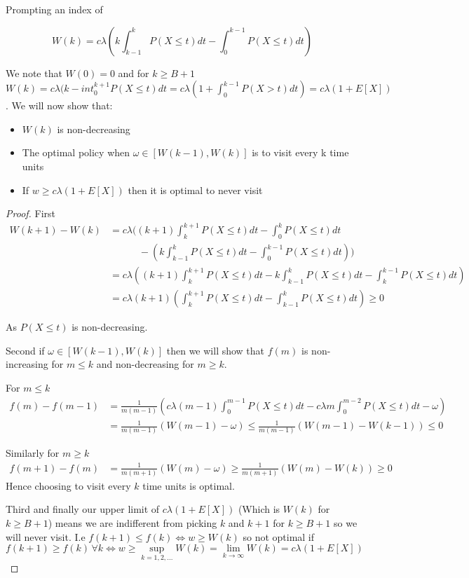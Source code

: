 \documentclass[a4paper,10pt]{article}
\theoremstyle{definition}
\theoremstyle{definition}
\theoremstyle{remark}
\theoremstyle{definition}
\begin{document}
Prompting an index of

$$W(k)=c \lambda (k \int_{k-1}^{k} P(X \leq t) dt - \int_{0}^{k-1} P(X \leq t) dt )$$

We note that $W(0)=0$ and for $k \geq B+1$ $W(k)=c \lambda (k - int_{0}^{k+1} P(X \leq t)dt=c \lambda (1+\int_{0}^{k-1} P(X > t)dt)=c \lambda (1+ E[X])$. We will now show that:
\begin{itemize}
\item $W(k)$ is non-decreasing
\item The optimal policy when $\omega \in [W(k-1),W(k)]$ is to visit every k time units
\item If $w \geq c \lambda (1+E[X])$ then it is optimal to never visit
\end{itemize}

\begin{proof}
First
\begin{align*}
W(k+1)-W(k)&= c \lambda ((k+1) \int_{k}^{k+1} P(X \leq t)dt - \int_{0}^{k} P(X \leq t)dt \\ & \quad \quad \quad -(k \int_{k-1}^{k} P(X \leq t)dt - \int_{0}^{k-1} P(X \leq t)dt)) \\ &=c \lambda ((k+1) \int_{k}^{k+1} P(X \leq t)dt -k \int_{k-1}^{k} P(X \leq t)dt - \int_{k}^{k-1} P(X \leq t)dt)\\ &=c \lambda (k+1) (\int_{k}^{k+1} P(X \leq t)dt - \int_{k-1}^{k} P(X \leq t)dt) \geq 0
\end{align*}

As $P(X \leq t)$ is non-decreasing.

Second if $\omega \in [W(k-1),W(k)]$ then we will show that $f(m)$ is non-increasing for $m \leq k$ and non-decreasing for $m \geq k$.

For $m \leq k$
\begin{align*}
f(m)-f(m-1)&=\frac{1}{m(m-1)}(c \lambda (m-1) \int_{0}^{m-1} P(X \leq t) dt - c \lambda m \int_{0}^{m-2} P(X \leq t) dt - \omega) \\
&=\frac{1}{m(m-1)}(W(m-1)-\omega) \leq \frac{1}{m(m-1)} (W(m-1)-W(k-1)) \leq 0
\end{align*}

Similarly for $m \geq k$
\begin{align*}
f(m+1)-f(m)&= \frac{1}{m(m+1)} (W(m)-\omega) \geq \frac{1}{m(m+1)} (W(m)-W(k)) \geq 0
\end{align*}
Hence choosing to visit every $k$ time units is optimal.

Third and finally our upper limit of $c \lambda (1+E[X])$ (Which is $W(k)$ for $k \geq B+1$) means we are indifferent from picking $k$ and $k+1$ for $k \geq B+1$ so we will never visit. I.e
$f(k+1) \leq f(k) \iff w \geq W(k)$ so not optimal if $f(k+1) \geq f(k) \, \forall k \iff w \geq \sup\limits_{k=1,2,...} W(k)=\lim\limits_{k \rightarrow \infty} W(k)=c \lambda (1+E[X])$
\end{proof}
\end{document}
